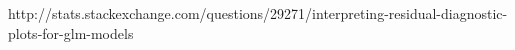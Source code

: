 http://stats.stackexchange.com/questions/29271/interpreting-residual-diagnostic-plots-for-glm-models
